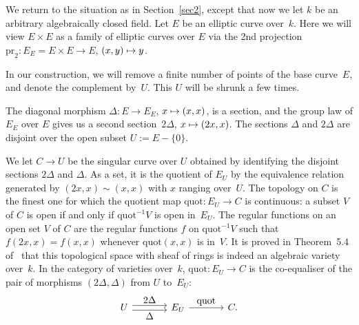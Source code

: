 \documentclass[11pt]{article}
\def\mto{\mathchoice{\longmapsto}{\mapsto}{\mapsto}{\mapsto}}
\theoremstyle{plain}
\theoremstyle{definition}
\numberwithin{equation}{subsection}
\newcommand{\pr}{\mathrm{pr}}
\newcommand{\quot}{\mathrm{quot}}
\begin{document}
We return to the situation as in Section~\ref{sec2}, except that now
we let $k$ be an arbitrary algebraically closed field. Let $E$ be an
elliptic curve over~$k$. Here we will view $E\times E$ as a family of
elliptic curves over $E$ via the 2nd projection $\pr_2\colon E_E =
E\times E\to E$, $(x,y)\mto y$.

In our construction, we will remove a finite number of points of the
base curve~$E$, and denote the complement by~$U$. This $U$ will be
shrunk a few times.

The diagonal morphism $\Delta\colon E\to E_E$, $x\mto(x,x)$, is a
section, and the group law of $E_E$ over $E$ gives us a second
section~$2\Delta$, $x\mto (2x,x)$. The sections $\Delta$ and
$2\Delta$ are disjoint over the open subset $U:=E-\{0\}$.

We let $C\to U$ be the singular curve over $U$ obtained by identifying
the disjoint sections $2\Delta$ and $\Delta$. As a set, it is the
quotient of $E_U$ by the equivalence relation generated by
$(2x,x)\sim (x,x)$ with $x$ ranging over~$U$. The topology on $C$
is the finest one for which the quotient map $\quot\colon E_U\to C$
is continuous: a subset $V$ of $C$ is open if and only if
$\quot^{-1}V$ is open in~$E_U$. The regular functions on an open
set $V$ of $C$ are the regular functions $f$ on $\quot^{-1}V$ such
that $f(2x,x)=f(x,x)$ whenever $\quot(x,x)$ is in~$V$. It is
proved in Theorem~5.4 of~\cite{Ferrand} that this topological space with sheaf
of rings is indeed an algebraic variety over~$k$. In the category of
varieties over~$k$, $\quot\colon E_U\to C$ is the co-equaliser of the pair of
morphisms $(2\Delta,\Delta)$ from $U$ to~$E_U$:\vspace*{-3pt}\enlargethispage{.5\baselineskip}%
\[
\begin{tikzcd}[column sep= large]
U \ar[r,shift left,"\textstyle 2\Delta"] \ar[r,shift right,"\textstyle \Delta"']& E_U \ar[r,"\textstyle \quot"]& C.
\end{tikzcd}
\]
\end{document}
